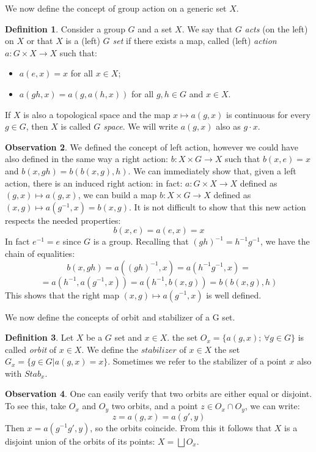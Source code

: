 \documentclass[12pt,a4paper]{report}
\theoremstyle{definition}
\newtheorem{Def}{Definition}[chapter]
\theoremstyle{Theorem}
\theoremstyle{definition}
\theoremstyle{definition}
\newtheorem{Obs}[Def]{Observation}
\begin{document}
	We now define the concept of group action on a generic set $X$.
	\begin{Def}
		Consider a group $G$ and a set $X$. We say that $G$ \textit{acts} (on the left) on $X$ or that $X$ is a (left) \textit{$G$ set} if there exists a map, called (left) \textit{action} $a:G\times X\rightarrow X$ such that:
		\begin{itemize}
			\item 	$a(e,x)=x$ for all $x\in X$;
			\item $a(gh,x)=a(g,a(h,x))$ for all $g,h\in G$ and $x\in X$.
		\end{itemize} 
		If $X$ is also a topological space and the map $x\longmapsto a(g,x)$ is continuous for every $g\in G$, then $X$ is called \textit{$G$ space}.
		We will write $a(g,x)$ also as $g\cdot x$.
	\end{Def}
	\begin{Obs}
		We defined the concept of left action, however we could have also defined in the same way a right action: $b:X\times G\rightarrow X$ such that $b(x,e)=x$ and $b(x,gh)=b(b(x,g),h)$. We can immediately show that, given a left action, there is an induced right action: in fact: $a:G\times X\rightarrow X$ defined as $(g,x)\longmapsto a(g,x)$, we can build a map $b:X\times G\rightarrow X$ defined as $(x,g)\longmapsto a(g^{-1},x)=b(x,g)$. 
		It is not difficult to show that this new action respects the needed properties:
		$$b(x,e)=a(e,x)=x$$
		In fact $e^{-1}=e$ since $G$ is a group. Recalling that $(gh)^{-1}=h^{-1}g^{-1}$, we have the chain of equalities:
		$$b(x,gh)=a((gh)^{-1},x)=a(h^{-1}g^{-1},x)=$$$$=a(h^{-1},a(g^{-1},x))=a(h^{-1},b(x,g))=b(b(x,g),h)$$
		This shows that the right map $(x,g)\longmapsto a(g^{-1},x)$ is well defined.
	\end{Obs}
	We now define the concepts of orbit and stabilizer of a G set.
	\begin{Def}
		Let $X$ be a $G$ set and $x\in X$. the set $O_x=\{a(g,x); \, \forall g\in G\}$ is called \textit{orbit} of $x\in X$. We define the $\textit{stabilizer}$ of $x\in X$ the set $G_x=\{g\in G|a(g,x)=x\}$. Sometimes we refer to the stabilizer of a point $x$ also with $Stab_x$.
	\end{Def}
	\begin{Obs} \label{Obs: 2.1}
		One can easily verify that two orbits are either equal or disjoint. To see this, take $O_x$ and $O_y$ two orbits, and a point $z\in O_x\cap O_y$, we can write:
		$$z=a(g,x)=a(g',y)$$
		Then $x=a(g^{-1}g',y)$, so the orbits coincide.
		From this it follows that $X$ is a disjoint union of the orbits of its points: $X=\bigsqcup O_x$.
	\end{Obs}
\end{document}
